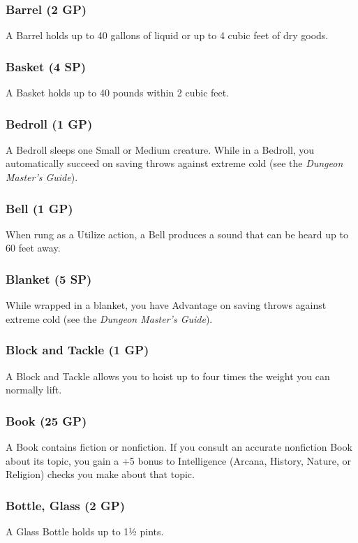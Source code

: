 \documentclass[10pt,a4paper,twoside,bg=print,twocolumn,openany,nodeprecatedcode]{dndbook}
\begin{document}
\subsubsection{Barrel (2 GP)}
A Barrel holds up to 40 gallons of liquid or up to 4 cubic feet of dry goods.

\subsubsection{Basket (4 SP)}
A Basket holds up to 40 pounds within 2 cubic feet.

\subsubsection{Bedroll (1 GP)}
A Bedroll sleeps one Small or Medium creature. While in a Bedroll, you automatically succeed on saving throws against extreme cold (see the \textit{Dungeon Master's Guide}).

\subsubsection{Bell (1 GP)}
When rung as a Utilize action, a Bell produces a sound that can be heard up to 60 feet away.

\subsubsection{Blanket (5 SP)}
While wrapped in a blanket, you have Advantage on saving throws against extreme cold (see the \textit{Dungeon Master's Guide}).

\subsubsection{Block and Tackle (1 GP)}
A Block and Tackle allows you to hoist up to four times the weight you can normally lift.

\subsubsection{Book (25 GP)}
A Book contains fiction or nonfiction. If you consult an accurate nonfiction Book about its topic, you gain a +5 bonus to Intelligence (Arcana, History, Nature, or Religion) checks you make about that topic.

\subsubsection{Bottle, Glass (2 GP)}
A Glass Bottle holds up to 1½ pints.
\end{document}
